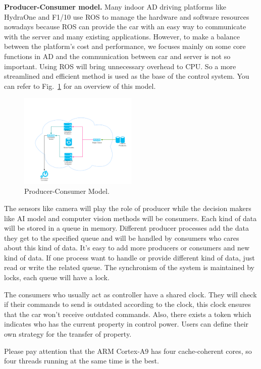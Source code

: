 \documentclass[conference]{IEEEtran}
\begin{document}
\textbf{Producer-Consumer model.} Many indoor AD driving platforms like HydraOne\cite{b9} and F1/10\cite{b11} use ROS\cite{b19} to manage the hardware and software resources nowadays because ROS can provide the car with an easy way to communicate with the server and many existing applications. However, to make a balance between the platform's cost and performance, we focuses mainly on some core functions in AD and the communication between car and server is not so important. Using ROS will bring unnecessary overhead to CPU. So a more streamlined and efficient method is used as the base of the control system. You can refer to Fig.~\ref{pcm} for an overview of this model.


\begin{figure}[htbp]
\centerline{\includegraphics[width=0.5\textwidth]{pcm.jpg}}
\caption{Producer-Consumer Model.}
\label{pcm}
\end{figure}

The sensors like camera will play the role of producer while the decision makers like AI model and computer vision methods will be consumers. Each kind of data will be stored in a queue in memory. Different producer processes add the data they get to the specified queue and will be handled by consumers who cares about this kind of data. It's easy to add more producers or consumers and new kind of data. If one process want to handle or provide different kind of data, just read or write the related queue. The synchronism of the system is maintained by locks, each queue will have a lock.

The consumers who usually act as controller have a shared clock. They will check if their commands to send is outdated according to the clock, this clock ensures that the car won't receive outdated commands. Also, there exists a token which indicates who has the current property in control power. Users can define their own strategy for the transfer of property.

Please pay attention that the ARM Cortex-A9 has four cache-coherent cores, so four threads running at the same time is the best. 
\end{document}
